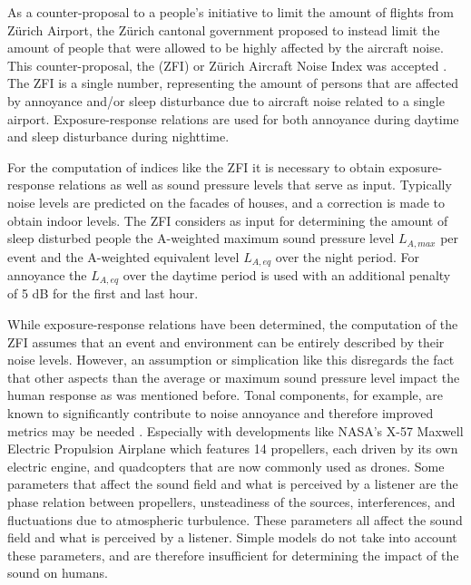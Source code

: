 As a counter-proposal to a people's initiative to limit the amount of flights
from Z\"{u}rich Airport, the Z\"{u}rich cantonal government proposed to instead limit
the amount of people that were allowed to be highly affected by the aircraft
noise. This counter-proposal, the  (ZFI) or Z\"{u}rich
Aircraft Noise Index was accepted \cite{Schaffer2012}. The ZFI is a single
number, representing the amount of persons that are affected by annoyance and/or
sleep disturbance due to aircraft noise related to a single airport.
Exposure-response relations are used for both annoyance during daytime and sleep
disturbance during nighttime.

For the computation of indices like the ZFI it is necessary to obtain
exposure-response relations as well as sound pressure levels that serve as
input. Typically noise levels are predicted on the facades of houses, and a
correction is made to obtain indoor levels. The ZFI considers as input for
determining the amount of sleep disturbed people the A-weighted maximum sound
pressure level $L_{A,max}$ per event and the A-weighted equivalent level
$L_{A,eq}$ over the night period. For annoyance the $L_{A,eq}$ over the daytime
period is used with an additional penalty of 5 dB for the first and last hour.

While exposure-response relations have been determined, the computation of the
ZFI assumes that an event and environment can be entirely described by their
noise levels. However, an assumption or simplication like this disregards the
fact that other aspects than the average or maximum sound pressure level impact
the human response as was mentioned before. Tonal components, for example, are
known to significantly contribute to noise annoyance and therefore improved
metrics may be needed \cite{Sahai2016,Sahai2016b}. Especially with developments
like NASA's X-57 Maxwell Electric Propulsion Airplane
\cite{Moore2012,Beutel2016} which features 14 propellers, each driven by its own
electric engine, and quadcopters \cite{Rizzi2015} that are now commonly used as
drones. Some parameters that affect the sound field and what is perceived by a
listener are the phase relation between propellers, unsteadiness of the sources,
interferences, and fluctuations due to atmospheric turbulence. These parameters
all affect the sound field and what is perceived by a listener. Simple models do
not take into account these parameters, and are therefore insufficient for
determining the impact of the sound on humans.


